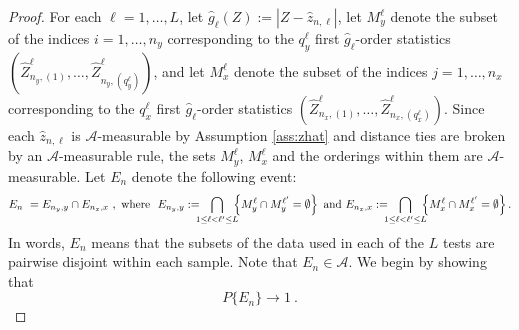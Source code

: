\documentclass[11pt]{article}
\numberwithin{equation}{section}
\begin{document}
\begin{proof}
  For each $\ell=1,\dots,L$, let $\hat g_\ell(Z):=|Z-\hat z_{n,\ell}|$, let $M_y^{\ell}$ denote the subset of the indices $i=1,\dots,n_y$ corresponding to the $q_y^{\ell}$ first $\hat g_\ell$-order statistics $(\hat Z^{\ell}_{n_y,(1)},\dots,\hat Z^{\ell}_{n_y,(q_y^{\ell})})$, and let $M_x^{\ell}$ denote the subset of the indices $j=1,\dots,n_x$ corresponding to the $q_x^{\ell}$ first $\hat g_\ell$-order statistics $(\hat Z^{\ell}_{n_x,(1)},\dots,\hat Z^{\ell}_{n_x,(q_x^{\ell})})$. Since each $\hat z_{n,\ell}$ is $\mathcal A$-measurable by Assumption \ref{ass:zhat} and distance ties are broken by an $\mathcal A$-measurable rule, the sets $M_y^{\ell}$, $M_x^{\ell}$ and the orderings within them are $\mathcal A$-measurable. Let $E_n$ denote the following event:
  \begin{equation*}
  E_{n}~=E_{n_y,y}\cap E_{n_x,x}~,~\text{where}~~
  E_{n_y,y}:=\hspace{-6pt}\bigcap_{1\le\ell<\ell'\le L}\hspace{-6pt}
  \left\{M_y^{\ell}\cap M_y^{\ell'}=\emptyset\right\}
  ~\text{and}~
  E_{n_x,x}:=\hspace{-6pt}\bigcap_{1\le\ell<\ell'\le L}\hspace{-6pt}
  \left\{M_x^{\ell}\cap M_x^{\ell'}=\emptyset\right\}.
  \end{equation*}
  In words, $E_n$ means that the subsets of the data used in each of the $L$ tests are pairwise disjoint within each sample. Note that $E_n\in\mathcal A$. We begin by showing that
  \begin{equation}
  P\{E_{n}\}\rightarrow 1~.\label{eq:limit_randomz_L1}
  \end{equation}
  

\end{proof}
\end{document}
